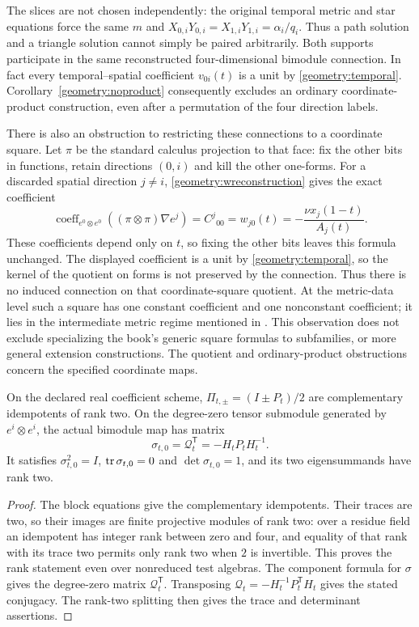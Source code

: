 \documentclass[11pt,a4paper]{article}
\theoremstyle{remark}\newtheorem{remark}[theorem]{Remark}
\begin{document}
The slices are not chosen independently: the original temporal metric
and star equations force the same $m$ and
$X_{0,i}Y_{0,i}=X_{1,i}Y_{1,i}=\alpha_i/q_i$.
Thus a path solution and a triangle solution cannot simply be paired
arbitrarily. Both supports participate in the same reconstructed
four-dimensional bimodule connection. In fact every temporal--spatial
coefficient $v_{0i}(t)$ is a unit by \eqref{geometry:temporal}.
Corollary~\ref{geometry:noproduct} consequently excludes an ordinary
coordinate-product construction, even after a permutation of the four
direction labels.

There is also an obstruction to restricting these connections to a
coordinate square. Let $\pi$ be the standard calculus projection to
that face: fix the other bits in functions, retain directions $(0,i)$
and kill the other one-forms. For a discarded spatial direction $j\ne i$,
\eqref{geometry:wreconstruction} gives the exact coefficient
\[
 \operatorname{coeff}_{e^0\otimes e^0}
       ((\pi\otimes\pi)\nabla e^j)
 =C^j{}_{00}=w_{j0}(t)=-\frac{\nu x_j(1-t)}{A_j(t)}.
\]
These coefficients depend only on $t$, so fixing the other bits leaves
this formula unchanged.
The displayed coefficient is a unit by \eqref{geometry:temporal}, so
the kernel of the quotient on forms is not preserved by the connection.
Thus there is no induced connection on that coordinate-square quotient.
At the metric-data level such a square has one constant coefficient and
one nonconstant coefficient; it lies in the intermediate metric regime
mentioned in \cite[Example~8.20, p.~598]{orig-book}. This observation
does not exclude specializing the book's generic square formulas to
subfamilies, or more general extension constructions. The quotient and
ordinary-product obstructions concern the specified coordinate maps.

\begin{proposition}
\label{geometry:balanced}
On the declared real coefficient scheme,
$\Pi_{t,\pm}=(I\pm P_t)/2$ are complementary idempotents of rank two.
On the degree-zero tensor submodule generated by $e^i\otimes e^i$,
the actual bimodule map has matrix
\[
 \sigma_{t,0}=\mathscr Q_t^{\mathsf T}=-H_tP_tH_t^{-1}.
\]
It satisfies $\sigma_{t,0}^2=I$, $\operatorname{tr}\sigma_{t,0}=0$ and
$\det\sigma_{t,0}=1$, and its two eigensummands have rank two.
\end{proposition}
\begin{proof}
The block equations give the complementary idempotents. Their traces
are two, so their images are finite projective modules of rank two:
over a residue field an idempotent has integer rank between zero and
four, and equality of that rank with its trace two permits only rank
two when $2$ is invertible. This proves the rank statement even over
nonreduced test algebras. The component formula for $\sigma$ gives
the degree-zero matrix $\mathscr Q_t^{\mathsf T}$. Transposing
$\mathscr Q_t=-H_t^{-1}P_t^{\mathsf T}H_t$ gives the stated conjugacy.
The rank-two splitting then gives the trace and determinant assertions.
\end{proof}
\end{document}
